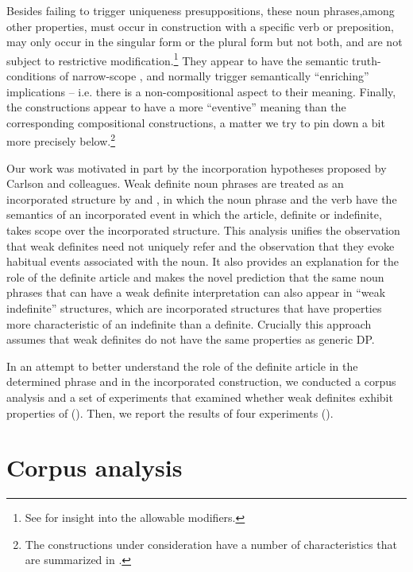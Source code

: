 \documentclass[output=paper,
modfonts
]{langscibook}
\begin{document}
Besides failing to trigger uniqueness presuppositions, these noun phrases,\linebreak among other properties, must occur in construction with a specific verb or preposition, may only occur in the singular form or the plural form but not both, and are not subject to restrictive modification.\footnote{See \citet{Aguilar-Guevara2014} for insight into the allowable modifiers.} They appear to have the semantic truth-conditions of narrow-scope , and normally trigger semantically “enriching” implications -- i.e. there is a non-compositional aspect to their meaning. Finally, the constructions appear to have a more “eventive” meaning than the corresponding compositional constructions, a matter we try to pin down a bit more precisely below.\footnote{ The constructions under consideration have a number of characteristics that are summarized in \citet{CarlsonEtAlii2006}.}

Our work was motivated in part by the incorporation hypotheses proposed by Carlson and colleagues. Weak definite noun phrases are treated as an incorporated structure by \citet{CarlsonEtAlii2013} and \citet{KleinEtAlii2013}, in which the noun phrase and the verb have the semantics of an incorporated event in which the article, definite or indefinite, takes scope over the incorporated structure. This analysis unifies the observation that weak definites need not uniquely refer and the observation that they evoke habitual events associated with the noun. It also provides an explanation for the role of the definite article and makes the novel prediction that the same noun phrases that can have a weak definite interpretation can also appear in “weak indefinite” structures, which are incorporated structures that have properties more characteristic of an indefinite than a definite. Crucially this approach assumes that weak definites do not have the same properties as generic DP.

In an attempt to better understand the role of the definite article in the determined phrase and in the incorporated construction, we conducted a corpus analysis and a set of experiments that examined whether weak definites exhibit properties of  (). Then, we report the results of four experiments ().

\section{Corpus analysis} \label{seC:desaetal:3}
\end{document}
